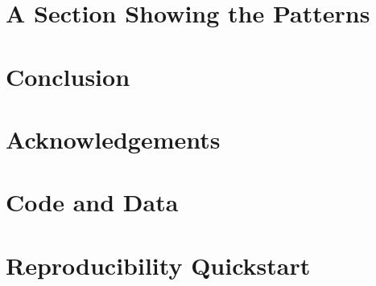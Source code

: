 \documentclass[12pt, letterpaper]{article}
\begin{document}
\section{A Section Showing the Patterns}



\section{Conclusion}


\section*{Acknowledgements}


\appendix

\section{Code and Data}


\section{Reproducibility Quickstart}




\end{document}

